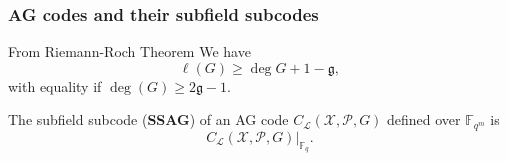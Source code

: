 \documentclass[
10pt, %
%
aspectratio=169, %
]{beamer}
\theoremstyle{plain}%
\theoremstyle{definition}
\theoremstyle{remark}
\newcommand{\calP}{\mathcal{P}}
\newcommand{\calL}{\mathcal{L}}
\newcommand{\calC}{\mathcal{C}}
\newcommand{\calX}{\mathcal{X}}
\newcommand{\fqm}{\mathbb{F}_{q^m}}
\newcommand{\fq}{\mathbb{F}_{q}}
\newcommand{\Span}[1]{\operatorname{Span}\left\lbrace #1\right\rbrace }
\begin{document}
\begin{frame}
	\frametitle{AG codes and their subfield subcodes }
\begin{block}{From Riemann-Roch Theorem \cite{Sti09}}
	We have 
	\[\ell(G)\geq \deg G +1-\mathfrak{g},\]
	with equality if $\deg (G) \geq 2\mathfrak{g} -1$.
\end{block}
\begin{tcolorbox}[colback= aliceblue]
	The subfield subcode (\textbf{SSAG}) of an AG code $C_{\calL}(\calX,\calP,G)$ defined over $\fqm$ is
	\[C_{\calL}(\calX,\calP,G)|_{\fq}.\]
\end{tcolorbox}
\end{frame}
\end{document}
